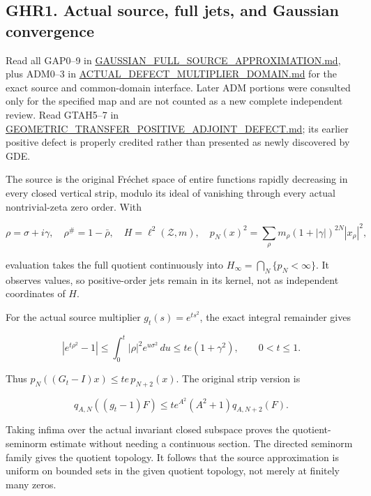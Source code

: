 \documentclass[
]{article}
\begin{document}
\subsection{GHR1. Actual source, full jets, and Gaussian convergence}\label{ghr1.-actual-source-full-jets-and-gaussian-convergence}

Read all GAP0--9 in \href{https://github.com/KokunoYumeto/zeta-function-research-reader/blob/main/workbenches/splitzero-tandem/continuations/20260925-source-endpoint-and-section/GAUSSIAN_FULL_SOURCE_APPROXIMATION.md}{GAUSSIAN\_FULL\_SOURCE\_APPROXIMATION.md}, plus ADM0--3 in \href{https://github.com/KokunoYumeto/zeta-function-research-reader/blob/main/workbenches/splitzero-tandem/continuations/20260925-source-endpoint-and-section/ACTUAL_DEFECT_MULTIPLIER_DOMAIN.md}{ACTUAL\_DEFECT\_MULTIPLIER\_DOMAIN.md} for the exact source and common-domain interface. Later ADM portions were consulted only for the specified map and are not counted as a new complete independent review. Read GTAH5--7 in \href{https://github.com/KokunoYumeto/zeta-function-research-reader/blob/main/workbenches/splitzero-tandem/continuations/20260925-source-endpoint-and-section/GEOMETRIC_TRANSFER_POSITIVE_ADJOINT_DEFECT.md}{GEOMETRIC\_TRANSFER\_POSITIVE\_ADJOINT\_DEFECT.md}; its earlier positive defect is properly credited rather than presented as newly discovered by GDE.

The source is the original Fréchet space of entire functions rapidly decreasing in every closed vertical strip, modulo its ideal of vanishing through every actual nontrivial-zeta zero order. With

\[
\rho=\sigma+i\gamma,\quad \rho^\#=1-\bar\rho,
\quad H=\ell^2(\mathscr Z,m),\quad
p_N(x)^2=\sum_\rho m_\rho(1+|\gamma|)^{2N}|x_\rho|^2,
\]

evaluation takes the full quotient continuously into \(H_\infty=\bigcap_N\{p_N<\infty\}\). It observes values, so positive-order jets remain in its kernel, not as independent coordinates of \(H\).

For the actual source multiplier \(g_t(s)=e^{ts^2}\), the exact integral remainder gives

\[
|e^{t\rho^2}-1|
\le\int_0^t |\rho|^2e^{u\sigma^2}\,du
\le te(1+\gamma^2),\qquad 0<t\le1.
\]

Thus \(p_N((G_t-I)x)\le te\,p_{N+2}(x)\). The original strip version is

\[
q_{A,N}((g_t-1)F)
\le te^{A^2}(A^2+1)q_{A,N+2}(F).
\]

Taking infima over the actual invariant closed subspace proves the quotient-seminorm estimate without needing a continuous section. The directed seminorm family gives the quotient topology. It follows that the source approximation is uniform on bounded sets in the given quotient topology, not merely at finitely many zeros.
\end{document}
